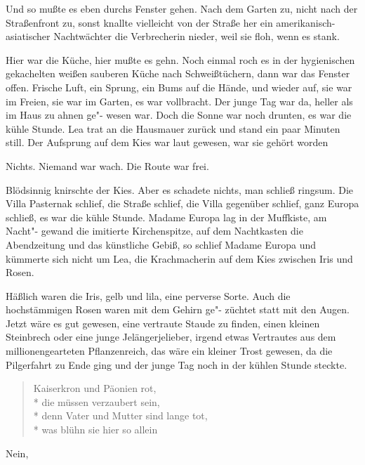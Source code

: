 Und so mußte es eben durchs Fenster gehen. Nach dem Garten
zu, nicht nach der Straßenfront zu, sonst knallte vielleicht von
der Straße her ein amerikanisch-asiatischer Nachtwächter die
Verbrecherin nieder, weil sie floh, wenn es stank.

Hier war die Küche, hier mußte es gehn. Noch einmal roch es
in der hygienischen gekachelten weißen sauberen Küche nach
Schweißtüchern, dann war das Fenster offen. Frische Luft, ein
Sprung, ein Bums auf die Hände, und wieder auf, sie war
im Freien, sie war im Garten, es war vollbracht.
\abstand{}
Der junge Tag war da, heller als im Haus zu ahnen ge"-%
wesen war. Doch die Sonne war noch drunten, es war die
kühle Stunde. Lea trat an die Hausmauer zurück und stand ein
paar Minuten still. Der Aufsprung auf dem Kies war laut
gewesen, war sie gehört worden\frag{}

Nichts. Niemand war wach. Die Route war frei.

Blödsinnig knirschte der Kies. Aber es schadete nichts, man
schließ ringsum. Die Villa Pasternak schlief, die Straße schlief,
die Villa gegenüber schlief, ganz Europa schließ, es war die
kühle Stunde. Madame Europa lag in der Muffkiste, am Nacht"-%
gewand die imitierte Kirchenspitze, auf dem Nachtkasten die
Abendzeitung und das künstliche Gebiß, so schlief Madame
Europa und kümmerte sich nicht um Lea, die Krachmacherin
auf dem Kies zwischen Iris und Rosen.

Häßlich waren die Iris, gelb und lila, eine perverse Sorte.
Auch die hochstämmigen Rosen waren mit dem Gehirn ge"-%
züchtet statt mit den Augen. Jetzt wäre es gut gewesen, eine
vertraute Staude zu finden, einen kleinen Steinbrech oder eine
junge Jelängerjelieber, irgend etwas Vertrautes aus dem
millionengearteten Pflanzenreich, das wäre ein kleiner
Trost gewesen, da die Pilgerfahrt zu Ende ging und der junge
Tag noch in der kühlen Stunde steckte.

\begin{verse}Kaiserkron und Päonien rot,\\*
die müssen verzaubert sein,\\*
denn Vater und Mutter sind lange tot,\\*
was blühn sie hier so allein\frag{}
\end{verse}

\noindent{}Nein,
